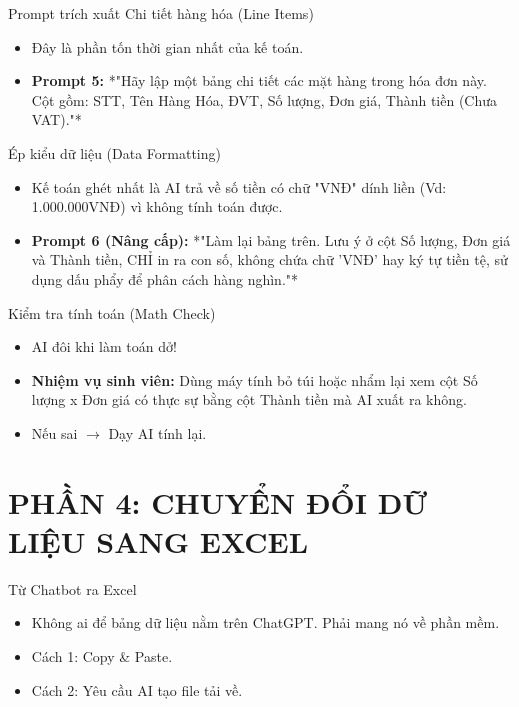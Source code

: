\documentclass[aspectratio=169]{beamer}
\begin{document}
\begin{frame}{Prompt trích xuất Chi tiết hàng hóa (Line Items)}
    \begin{itemize}
        \item Đây là phần tốn thời gian nhất của kế toán.
        \item \textbf{Prompt 5:} *"Hãy lập một bảng chi tiết các mặt hàng trong hóa đơn này. Cột gồm: STT, Tên Hàng Hóa, ĐVT, Số lượng, Đơn giá, Thành tiền (Chưa VAT)."*
    \end{itemize}
\end{frame}


\begin{frame}{Ép kiểu dữ liệu (Data Formatting)}
    \begin{itemize}
        \item Kế toán ghét nhất là AI trả về số tiền có chữ "VNĐ" dính liền (Vd: 1.000.000VNĐ) vì không tính toán được.
        \item \textbf{Prompt 6 (Nâng cấp):} *"Làm lại bảng trên. Lưu ý ở cột Số lượng, Đơn giá và Thành tiền, CHỈ in ra con số, không chứa chữ 'VNĐ' hay ký tự tiền tệ, sử dụng dấu phẩy để phân cách hàng nghìn."*
    \end{itemize}
\end{frame}


\begin{frame}{Kiểm tra tính toán (Math Check)}
    \begin{itemize}
        \item AI đôi khi làm toán dở!
        \item \textbf{Nhiệm vụ sinh viên:} Dùng máy tính bỏ túi hoặc nhẩm lại xem cột Số lượng x Đơn giá có thực sự bằng cột Thành tiền mà AI xuất ra không.
        \item Nếu sai $\rightarrow$ Dạy AI tính lại.
    \end{itemize}
\end{frame}


\section{PHẦN 4: CHUYỂN ĐỔI DỮ LIỆU SANG EXCEL}


\begin{frame}{Từ Chatbot ra Excel}
    \begin{itemize}
        \item Không ai để bảng dữ liệu nằm trên ChatGPT. Phải mang nó về phần mềm.
        \item Cách 1: Copy \& Paste.
        \item Cách 2: Yêu cầu AI tạo file tải về.
    \end{itemize}
\end{frame}
\end{document}
